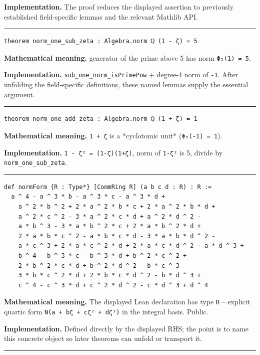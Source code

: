 \documentclass[UTF8,a4paper,11pt,fontset=fandol]{ctexart}
\theoremstyle{definition}
\newcommand{\statementsep}{\par\medskip\hrule\medskip}
\begin{document}
\noindent\textbf{Implementation.} The proof reduces the displayed assertion to previously established field-specific lemmas and the relevant Mathlib API.\par
\statementsep
\begin{verbatim}
theorem norm_one_sub_zeta : Algebra.norm ℚ (1 - ζ) = 5
\end{verbatim}
\noindent\textbf{Mathematical meaning.} generator of the prime above 5 has norm \texttt{Φ₅(1) = 5}.\par
\noindent\textbf{Implementation.} \texttt{sub\_\allowbreak{}one\_\allowbreak{}norm\_\allowbreak{}isPrimePow} + degree-4 norm of \texttt{-1}. After unfolding the field-specific definitions, these named lemmas supply the essential argument.\par
\statementsep
\begin{verbatim}
theorem norm_one_add_zeta : Algebra.norm ℚ (1 + ζ) = 1
\end{verbatim}
\noindent\textbf{Mathematical meaning.} \texttt{1 + ζ} is a *cyclotomic unit* (\texttt{Φ₅(-1) = 1}).\par
\noindent\textbf{Implementation.} \texttt{1 - ζ² = (1-ζ)(1+ζ)}, norm of \texttt{1-ζ²} is 5, divide by \texttt{norm\_\allowbreak{}one\_\allowbreak{}sub\_\allowbreak{}zeta}.\par
\statementsep
\begin{verbatim}
def normForm {R : Type*} [CommRing R] (a b c d : R) : R :=
  a ^ 4 - a ^ 3 * b - a ^ 3 * c - a ^ 3 * d +
    a ^ 2 * b ^ 2 + 2 * a ^ 2 * b * c + 2 * a ^ 2 * b * d +
    a ^ 2 * c ^ 2 - 3 * a ^ 2 * c * d + a ^ 2 * d ^ 2 -
    a * b ^ 3 - 3 * a * b ^ 2 * c + 2 * a * b ^ 2 * d +
    2 * a * b * c ^ 2 - a * b * c * d - 3 * a * b * d ^ 2 -
    a * c ^ 3 + 2 * a * c ^ 2 * d + 2 * a * c * d ^ 2 - a * d ^ 3 +
    b ^ 4 - b ^ 3 * c - b ^ 3 * d + b ^ 2 * c ^ 2 +
    2 * b ^ 2 * c * d + b ^ 2 * d ^ 2 - b * c ^ 3 -
    3 * b * c ^ 2 * d + 2 * b * c * d ^ 2 - b * d ^ 3 +
    c ^ 4 - c ^ 3 * d + c ^ 2 * d ^ 2 - c * d ^ 3 + d ^ 4
\end{verbatim}
\noindent\textbf{Mathematical meaning.} The displayed Lean declaration has type \texttt{R} -- explicit quartic form \texttt{N(a + bζ + cζ² + dζ³)} in the integral basis. Public.\par
\noindent\textbf{Implementation.} Defined directly by the displayed RHS; the point is to name this concrete object so later theorems can unfold or transport it.\par
\statementsep
\end{document}
